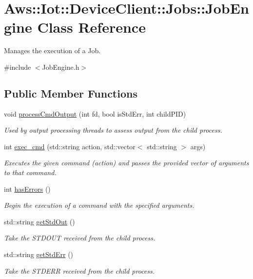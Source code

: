 \hypertarget{class_aws_1_1_iot_1_1_device_client_1_1_jobs_1_1_job_engine}{}\section{Aws\+:\+:Iot\+:\+:Device\+Client\+:\+:Jobs\+:\+:Job\+Engine Class Reference}
\label{class_aws_1_1_iot_1_1_device_client_1_1_jobs_1_1_job_engine}


Manages the execution of a Job.  




{\ttfamily \#include $<$Job\+Engine.\+h$>$}

\subsection*{Public Member Functions}
\begin{DoxyCompactItemize}
\item 
void \hyperlink{class_aws_1_1_iot_1_1_device_client_1_1_jobs_1_1_job_engine_aab65000d16ffe1c250c9af0c51d9abe6}{process\+Cmd\+Output} (int fd, bool is\+Std\+Err, int child\+P\+ID)
\begin{DoxyCompactList}\small\item\em Used by output processing threads to assess output from the child process. \end{DoxyCompactList}\item 
int \hyperlink{class_aws_1_1_iot_1_1_device_client_1_1_jobs_1_1_job_engine_a51fcb47a9ed2d8c32109d47cc4cfff6d}{exec\+\_\+cmd} (std\+::string action, std\+::vector$<$ std\+::string $>$ args)
\begin{DoxyCompactList}\small\item\em Executes the given command (action) and passes the provided vector of arguments to that command. \end{DoxyCompactList}\item 
int \hyperlink{class_aws_1_1_iot_1_1_device_client_1_1_jobs_1_1_job_engine_abcc11a86226e74648e3a5395ae180171}{has\+Errors} ()
\begin{DoxyCompactList}\small\item\em Begin the execution of a command with the specified arguments. \end{DoxyCompactList}\item 
std\+::string \hyperlink{class_aws_1_1_iot_1_1_device_client_1_1_jobs_1_1_job_engine_affcb240c8fd6c1fe197997131929c20e}{get\+Std\+Out} ()
\begin{DoxyCompactList}\small\item\em Take the S\+T\+D\+O\+UT received from the child process. \end{DoxyCompactList}\item 
std\+::string \hyperlink{class_aws_1_1_iot_1_1_device_client_1_1_jobs_1_1_job_engine_a2f3764967a7d06f30fe7e3df583b5040}{get\+Std\+Err} ()
\begin{DoxyCompactList}\small\item\em Take the S\+T\+D\+E\+RR received from the child process. \end{DoxyCompactList}\end{DoxyCompactItemize}
